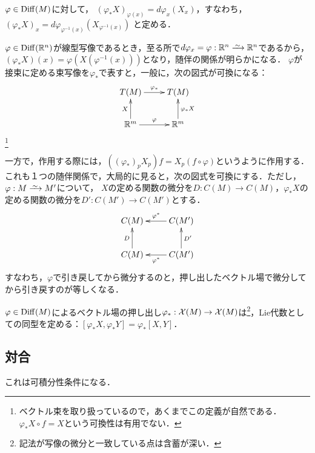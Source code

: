 \documentclass[uplatex,dvipdfmx]{jsreport}
\begin{document}
\begin{definition}
    $\varphi\in\mathrm{Diff}(M)$に対して，
    $(\varphi_*X)_{\varphi(x)}=d\varphi_x(X_x)$，すなわち，
    $(\varphi_*X)_x=d\varphi_{\varphi^{-1}(x)}(X_{\varphi^{-1}(x)})$
    と定める．
\end{definition}
\begin{remarks}[写像としてのベクトル場]
    $\varphi\in\mathrm{Diff}(\mathbb{R}^n)$が線型写像であるとき，至る所で$d\varphi_x=\varphi:\R^n\iso\R^n$であるから，
    $(\varphi_*X)(x)=\varphi(X(\varphi^{-1}(x)))$となり，随伴の関係が明らかになる．
    $\varphi$が接束に定める束写像を$\varphi_*$で表すと，一般に，次の図式が可換になる：
    \[\xymatrix{
        T(M)\ar[r]^-{\varphi_*}&T(M)\\
        \R^m\ar[u]^-X\ar[r]^-{\varphi}&\R^m\ar[u]_-{\varphi_*X}
    }\]\footnote{ベクトル束を取り扱っているので，あくまでこの定義が自然である．$\varphi_*X\circ f=X$という可換性は有用でない．}
\end{remarks}
\begin{remarks}[作用素としてのベクトル場]
    一方で，作用する際には，$((\varphi_*)_pX_p)f=X_p(f\circ\varphi)$というように作用する．
    これも１つの随伴関係で，大局的に見ると，次の図式を可換にする．ただし，$\varphi:M\iso M'$について，
    $X$の定める関数の微分を$D:C(M)\to C(M)$，$\varphi_*X$の定める関数の微分を$D':C(M')\to C(M')$とする．
    \[\xymatrix{
        C(M)&C(M')\ar[l]_-{\varphi^*}\\
        C(M)\ar[u]^-D&C(M')\ar[l]^-{\varphi^*}\ar[u]_-{D'}
    }\]
    すなわち，$\varphi$で引き戻してから微分するのと，押し出したベクトル場で微分してから引き戻すのが等しくなる．
\end{remarks}

\begin{proposition}
    $\varphi\in\mathrm{Diff}(M)$によるベクトル場の押し出し$\varphi_*:\mathcal{X}(M)\to\mathcal{X}(M)$は\footnote{記法が写像の微分と一致している点は含蓄が深い．}，Lie代数としての同型を定める：$[\varphi_*X,\varphi_*Y]=\varphi_*[X,Y]$．
\end{proposition}

\subsection{対合}

\begin{tcolorbox}[colframe=ForestGreen, colback=ForestGreen!10!white,breakable,colbacktitle=ForestGreen!40!white,coltitle=black,fonttitle=\bfseries\sffamily,
title=]
    これは可積分性条件になる．
\end{tcolorbox}
\end{document}
